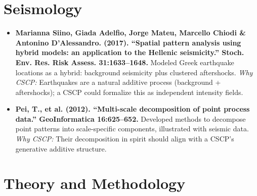 \documentclass[11pt]{article}
\begin{document}
	\section*{Seismology}
	
	\begin{itemize}
		\item \textbf{Marianna Siino, Giada Adelfio, Jorge Mateu, Marcello Chiodi \& Antonino D’Alessandro. (2017). ``Spatial pattern analysis using hybrid models: an application to the Hellenic seismicity.'' Stoch. Env. Res. Risk Assess. 31:1633--1648.}  
		Modeled Greek earthquake locations as a hybrid: background seismicity plus clustered aftershocks.  
		\emph{Why CSCP:} Earthquakes are a natural additive process (background + aftershocks); a CSCP could formalize this as independent intensity fields.
		
		\item \textbf{Pei, T., et al. (2012). ``Multi-scale decomposition of point process data.'' GeoInformatica 16:625--652.}  
		Developed methods to decompose point patterns into scale-specific components, illustrated with seismic data.  
		\emph{Why CSCP:} Their decomposition in spirit should align with a CSCP’s generative additive structure.
		
	\end{itemize}
	
	\section*{Theory and Methodology}
	
\end{document}
